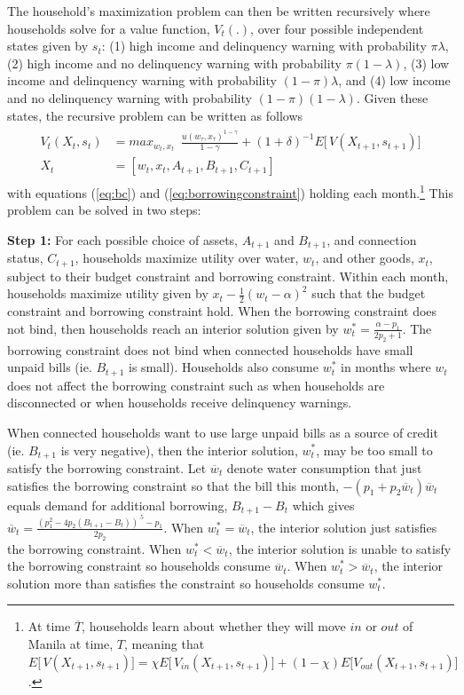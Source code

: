 \documentclass[12pt]{article}
\begin{document}
The household's maximization problem can then be written recursively where households solve for a value function, $V_t(.)$, over four possible independent states given by $s_{t}$: (1) high income and delinquency warning with probability $\pi\lambda$, (2) high income and no delinquency warning with probability $\pi(1-\lambda)$, (3) low income and delinquency warning with probability $(1-\pi)\lambda$, and (4) low income and no delinquency warning with probability $(1-\pi)(1-\lambda)$.  Given these states, the recursive problem can be written as follows
\begin{align}
\label{eq:valmax}
\begin{split}
V_t(X_{t},s_t) &= max_{w_t,x_{t}} \,\,\, \frac{u(w_{\tau},x_{\tau})^{1-\gamma}}{1-\gamma}   + (1+\delta)^{-1}  E \Big[\, V(X_{t+1},s_{t+1})\Big] \\
X_t &= [w_t,x_t,A_{t+1},B_{t+1},C_{t+1}] 
\end{split}
\end{align}
with equations (\ref{eq:bc}) and (\ref{eq:borrowingconstraint}) holding each month.\footnote{At time $\overline{T}$, households learn about whether they will move $in$ or $out$ of Manila at time, $T$, meaning that $E \Big[\, V(X_{t+1},s_{t+1})\Big] =  \chi E \Big[\,V_{in}(X_{t+1},s_{t+1})\Big] + (1-\chi) E\Big[V_{out}(X_{t+1},s_{t+1})\Big]$.}  This problem can be solved in two steps:

\textbf{Step 1:} For each possible choice of assets, $A_{t+1}$ and $B_{t+1}$, and connection status, $C_{t+1}$, households maximize utility over water, $w_t$, and other goods, $x_t$, subject to their budget constraint and borrowing constraint.  Within each month, households maximize utility given by $ x_t -  \frac{1}{2} (w_t - \alpha)^2 $ such that the budget constraint and borrowing constraint hold.  When the borrowing constraint does not bind, then households reach an interior solution given by $w_t^{*} =  \frac{ \alpha - p_1}{2p_2 + 1}$.  The borrowing constraint does not bind when connected households have small unpaid bills (ie. $B_{t+1}$ is small).  Households also consume $w_t^{*}$ in months where $w_t$ does not affect the borrowing constraint such as when households are disconnected or when households receive delinquency warnings.

When connected households want to use large unpaid bills as a source of credit (ie. $B_{t+1}$ is very negative), then the  interior solution, $w_t^{*}$, may be too small to satisfy the borrowing constraint.  Let $\overline{w}_t$ denote water consumption that just satisfies the borrowing constraint so that the bill this month, $-(p_1 +p_2\overline{w}_t)\overline{w}_t$ equals demand for additional borrowing, $B_{t+1}-B_{t}$ which gives $\overline{w}_t = \frac{(p_1^2 - 4p_2 (B_{t+1}-B_{t}))^{.5} - p_1}{2 p_2}$.  When $w_t^{*}=\overline{w}_t$, the interior solution just satisfies the borrowing constraint.  When $w_t^{*}<\overline{w}_t$, the interior solution is unable to satisfy the borrowing constraint so households consume $\overline{w}_t$.  When $w_t^{*}>\overline{w}_t$, the  interior solution more than satisfies the constraint so households consume $w_t^{*}$.
\end{document}
